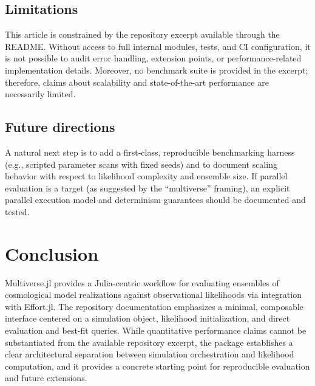 \documentclass[11pt]{article}
\begin{document}
\subsection{Limitations}
This article is constrained by the repository excerpt available through the README.
Without access to full internal modules, tests, and CI configuration, it is not possible to audit error handling, extension points, or performance-related implementation details.
Moreover, no benchmark suite is provided in the excerpt; therefore, claims about scalability and state-of-the-art performance are necessarily limited.

\subsection{Future directions}
A natural next step is to add a first-class, reproducible benchmarking harness (e.g., scripted parameter scans with fixed seeds) and to document scaling behavior with respect to likelihood complexity and ensemble size.
If parallel evaluation is a target (as suggested by the ``multiverse'' framing), an explicit parallel execution model and determinism guarantees should be documented and tested.

\section{Conclusion}
Multiverse.jl provides a Julia-centric workflow for evaluating ensembles of cosmological model realizations against observational likelihoods via integration with Effort.jl.
The repository documentation emphasizes a minimal, composable interface centered on a simulation object, likelihood initialization, and direct evaluation and best-fit queries.
While quantitative performance claims cannot be substantiated from the available repository excerpt, the package establishes a clear architectural separation between simulation orchestration and likelihood computation, and it provides a concrete starting point for reproducible evaluation and future extensions.
\end{document}
